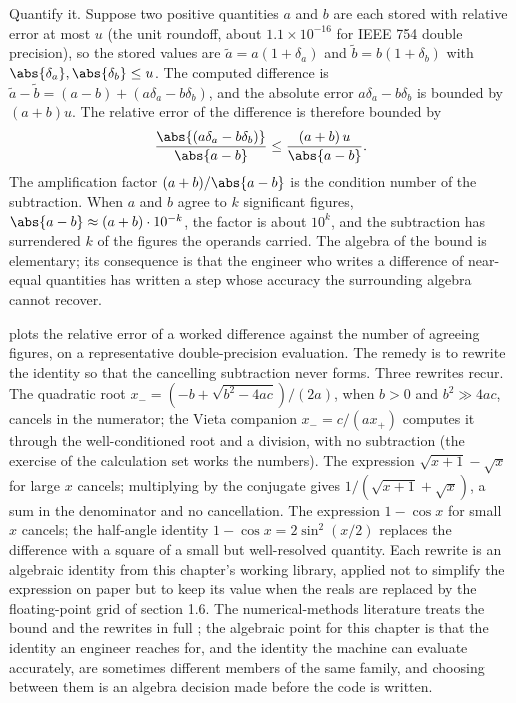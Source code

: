 Quantify it. Suppose two positive quantities $a$ and $b$ are each stored
with relative error at most $u$ (the unit roundoff, about $1.1 \times
10^{-16}$ for IEEE 754 double precision), so the stored values are
$\tilde a = a(1 + \delta_{a})$ and $\tilde b = b(1 + \delta_{b})$ with
$\abs{\delta_{a}}, \abs{\delta_{b}} \leq u$. The computed difference is
$\tilde a - \tilde b = (a - b) + (a \delta_{a} - b \delta_{b})$, and the
absolute error $a \delta_{a} - b \delta_{b}$ is bounded by $(a + b) u$.
The relative error of the difference is therefore bounded by
\[
\frac{\abs{(a \delta_{a} - b \delta_{b})}}{\abs{a - b}}
\leq \frac{(a + b)\, u}{\abs{a - b}}.
\]
The amplification factor $(a + b)/\abs{a - b}$ is the condition number
of the subtraction. When $a$ and $b$ agree to $k$ significant figures,
$\abs{a - b} \approx (a + b) \cdot 10^{-k}$, the factor is about
$10^{k}$, and the subtraction has surrendered $k$ of the figures the
operands carried. The algebra of the bound is elementary; its
consequence is that the engineer who writes a difference of near-equal
quantities has written a step whose accuracy the surrounding algebra
cannot recover.



 plots the relative error of a
worked difference against the number of agreeing figures, on a
representative double-precision evaluation. The remedy is to rewrite the
identity so that the cancelling subtraction never forms. Three rewrites
recur. The quadratic root $x_{-} = (-b + \sqrt{b^{2} - 4ac})/(2a)$,
when $b > 0$ and $b^{2} \gg 4ac$, cancels in the numerator; the Vieta
companion $x_{-} = c/(a x_{+})$ computes it through the well-conditioned
root and a division, with no subtraction (the exercise of the
calculation set works the numbers). The expression $\sqrt{x + 1} -
\sqrt{x}$ for large $x$ cancels; multiplying by the conjugate gives
$1/(\sqrt{x + 1} + \sqrt{x})$, a sum in the denominator and no
cancellation. The expression $1 - \cos x$ for small $x$ cancels;
the half-angle identity $1 - \cos x = 2 \sin^{2}(x/2)$ replaces the
difference with a square of a small but well-resolved quantity. Each
rewrite is an algebraic identity from this chapter's working library,
applied not to simplify the expression on paper but to keep its value
when the reals are replaced by the floating-point grid of section 1.6.
The numerical-methods literature treats the bound and the rewrites in
full \cite{text:higham-numerical}; the algebraic point for this chapter
is that the identity an engineer reaches for, and the identity the
machine can evaluate accurately, are sometimes different members of the
same family, and choosing between them is an algebra decision made
before the code is written.

